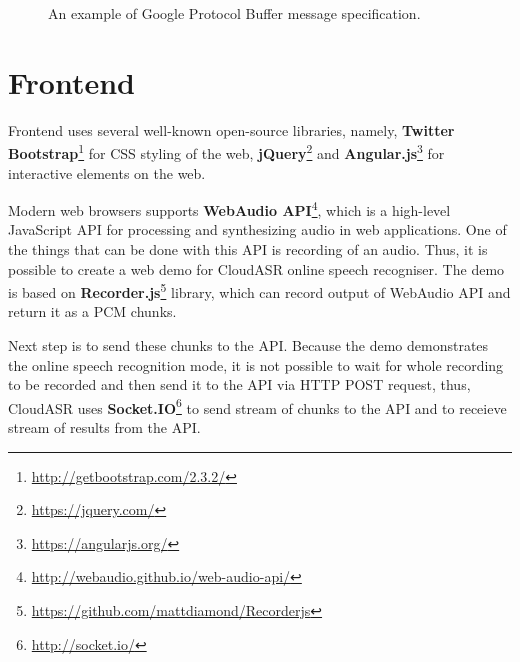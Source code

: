 \begin{figure}
  

  \label{fig:protobuf}
  \caption{An example of Google Protocol Buffer message specification.}
\end{figure}


\section{Frontend}
Frontend uses several well-known open-source libraries, namely,
  \textbf{Twitter Bootstrap}\footnote{\url{http://getbootstrap.com/2.3.2/}} for CSS styling of the web,
  \textbf{jQuery}\footnote{\url{https://jquery.com/}}
  and \textbf{Angular.js}\footnote{\url{https://angularjs.org/}} for interactive elements on the web.


Modern web browsers supports \textbf{WebAudio API}\footnote{\url{http://webaudio.github.io/web-audio-api/}},
  which is a high-level JavaScript API for processing and synthesizing audio in web applications.
One of the things that can be done with this API is recording of an audio.
Thus, it is possible to create a web demo for CloudASR online speech recogniser.
The demo is based on \textbf{Recorder.js}\footnote{\url{https://github.com/mattdiamond/Recorderjs}} library,
  which can record output of WebAudio API and return it as a PCM chunks.

Next step is to send these chunks to the API.
Because the demo demonstrates the online speech recognition mode,
  it is not possible to wait for whole recording to be recorded and then send it to the API via HTTP POST request,
  thus, CloudASR uses \textbf{Socket.IO}\footnote{\url{http://socket.io/}} to send stream of chunks to the API
  and to receieve stream of results from the API.


